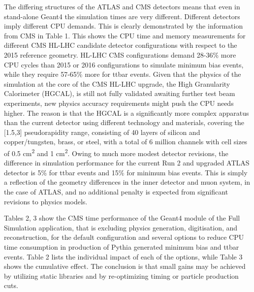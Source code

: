 \documentclass[12pt,a4paper]{article}
\begin{document}
{The differing structures of the ATLAS and CMS detectors means that even
in stand-alone Geant4 the simulation times are very different. Different
detectors imply different CPU demands. This is clearly demonstrated by
the information from CMS in Table 1. This shows the CPU time and memory
measurements for different CMS HL-LHC candidate detector configurations
with respect to the 2015 reference geometry. HL-LHC CMS configurations
demand 28-36\% more CPU cycles than 2015 or 2016 configurations to
simulate minimum bias events, while they require 57-65\% more for ttbar
events. Given that the physics of the simulation at the core of the CMS
HL-LHC upgrade, the High Granularity Calorimeter (HGCAL), is still not
fully validated awaiting further test beam experiments, new physics
accuracy requirements might push the CPU needs higher. The reason is
that the HGCAL is a significantly more complex apparatus than the
current detector using different technology and materials, covering the
{[}1.5,3{]} pseudorapidity range, consisting of 40 layers of silicon and
copper/tungsten, brass, or steel, with a total of 6 million channels
with cell sizes of 0.5 cm\textsuperscript{2} and 1
cm\textsuperscript{2}. Owing to much more modest detector revisions, the
difference in simulation performance for the current Run 2 and upgraded
ATLAS detector is 5\% for ttbar events and 15\% for minimum bias events.
This is simply a reflection of the geometry differences in the inner
detector and muon system, in the case of ATLAS, and no additional
penalty is expected from significant revisions to physics models.

Tables 2, 3 show the CMS time performance of the Geant4 module of the
Full Simulation application, that is excluding physics generation,
digitisation, and reconstruction, for the default configuration and
several options to reduce CPU time consumption in production of Pythia
generated minimum bias and ttbar events. Table 2 lists the
individual impact of each of the options, while Table 3 shows the
cumulative effect. The conclusion is that small gains may be achieved by
utilizing static libraries and by re-optimizing timing or particle
production cuts. 

}
\end{document}
